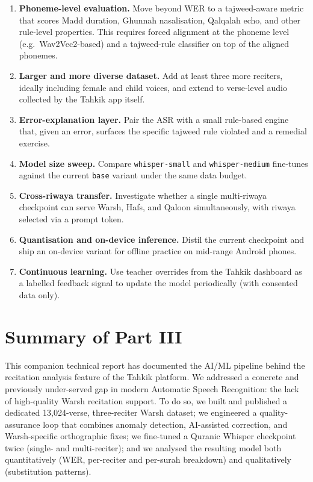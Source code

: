 \begin{goldbox}[title=Future work]
\begin{enumerate}
  \item \textbf{Phoneme-level evaluation.} Move beyond WER to a
        tajweed-aware metric that scores Madd duration, Ghunnah
        nasalisation, Qalqalah echo, and other rule-level properties.
        This requires forced alignment at the phoneme level (e.g.\
        Wav2Vec2-based) and a tajweed-rule classifier on top of the
        aligned phonemes.
  \item \textbf{Larger and more diverse dataset.} Add at least three
        more reciters, ideally including female and child voices, and
        extend to verse-level audio collected by the Tahkik app itself.
  \item \textbf{Error-explanation layer.} Pair the ASR with a small
        rule-based engine that, given an error, surfaces the specific
        tajweed rule violated and a remedial exercise.
  \item \textbf{Model size sweep.} Compare \texttt{whisper-small} and
        \texttt{whisper-medium} fine-tunes against the current
        \texttt{base} variant under the same data budget.
  \item \textbf{Cross-riwaya transfer.} Investigate whether a single
        multi-riwaya checkpoint can serve Warsh, Hafs, and Qaloon
        simultaneously, with riwaya selected via a prompt token.
  \item \textbf{Quantisation and on-device inference.} Distil the
        current checkpoint and ship an on-device variant for offline
        practice on mid-range Android phones.
  \item \textbf{Continuous learning.} Use teacher overrides from the
        Tahkik dashboard as a labelled feedback signal to update the
        model periodically (with consented data only).
\end{enumerate}
\end{goldbox}

\chapter*{Summary of Part III}
\label{ch:mt_conclusion}

This companion technical report has documented the AI/ML pipeline
behind the recitation analysis feature of the Tahkik platform. We
addressed a concrete and previously under-served gap in modern
Automatic Speech Recognition: the lack of high-quality Warsh
recitation support. To do so, we built and published a dedicated
13{,}024-verse, three-reciter Warsh dataset; we engineered a
quality-assurance loop that combines anomaly detection, AI-assisted
correction, and Warsh-specific orthographic fixes; we fine-tuned a
Quranic Whisper checkpoint twice (single- and multi-reciter); and we
analysed the resulting model both quantitatively (WER, per-reciter and
per-surah breakdown) and qualitatively (substitution patterns).

